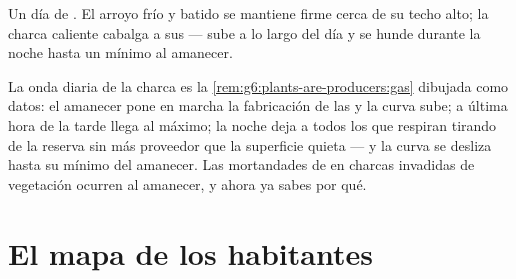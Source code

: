 \begin{omfigure}

{\small Un día de . El arroyo frío y batido se mantiene
firme cerca de su techo alto; la charca caliente cabalga a sus
 --- sube a lo largo del día y se hunde durante la noche
hasta un mínimo al amanecer.}
\end{omfigure}

\begin{example}\label{ex:g7:oxygen-in-the-water:curve}
La onda diaria de la charca es la
\cref{rem:g6:plants-are-producers:gas} dibujada como datos: el amanecer
pone en marcha la fabricación de las  y la curva sube; a
última hora de la tarde llega al máximo; la noche deja a todos los que
respiran tirando de la reserva sin más proveedor que la superficie
quieta --- y la curva se desliza hasta su mínimo del amanecer. Las
mortandades de  en charcas invadidas de vegetación ocurren al
amanecer, y ahora ya sabes por qué.
\end{example}

\section{El mapa de los habitantes}

